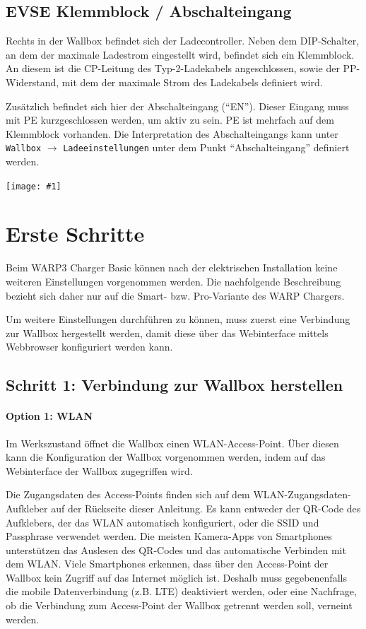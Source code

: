 \documentclass[a4paper,10pt]{article}
\newcommand{\gfx}[1]{\texttt{[image: \#1]}}
\begin{document}
\begin{multicols*}{2}
    \vspace{-0.1cm}
	\subsection{EVSE Klemmblock / Abschalteingang}\label{abschalteingang}
	Rechts in der Wallbox befindet sich der Ladecontroller. Neben dem DIP-Schalter,
	an dem der maximale Ladestrom eingestellt wird, befindet sich ein
	Klemmblock. An diesem ist die CP-Leitung des Typ-2-Ladekabels angeschlossen,
	sowie der PP-Widerstand, mit dem der maximale Strom des Ladekabels
	definiert wird.

	Zusätzlich befindet sich hier der Abschalteingang (\enquote{EN}).
	Dieser Eingang muss mit PE kurzgeschlossen werden, um aktiv zu sein. PE ist
	mehrfach auf dem Klemmblock vorhanden. Die Interpretation des Abschalteingangs kann unter \texttt{Wallbox} $\rightarrow$ \texttt{Ladeeinstellungen} unter dem Punkt \enquote{Abschalteingang} definiert werden.

    \gfx{./img_warp3/resized/evse_clamp.jpg}

    \newpage
    \section{Erste Schritte}\label{setup}

    Beim WARP3 Charger Basic können nach der elektrischen Installation
    keine weiteren Einstellungen vorgenommen werden. Die nachfolgende
    Beschreibung bezieht sich daher nur auf die Smart- bzw. Pro-Variante des WARP
    Chargers.

    Um weitere Einstellungen durchführen zu können, muss zuerst eine Verbindung
    zur Wallbox hergestellt werden, damit diese über das Webinterface mittels
	Webbrowser konfiguriert werden kann.

    \subsection{Schritt 1: Verbindung zur Wallbox herstellen}

    \paragraph{Option 1: WLAN}
    Im Werkszustand öffnet die Wallbox einen WLAN-Access-Point. Über diesen kann
    die Konfiguration der Wallbox vorgenommen werden, indem auf das
    Webinterface der Wallbox zugegriffen wird.

    Die Zugangsdaten des Access-Points finden sich auf dem WLAN-Zugangsdaten-Aufkleber
    auf der Rückseite dieser Anleitung. Es kann entweder der QR-Code des Aufklebers,
    der das WLAN automatisch konfiguriert, oder die SSID und Passphrase verwendet werden.
    Die meisten Kamera-Apps von Smartphones unterstützen das Auslesen des
    QR-Codes und das automatische Verbinden mit dem WLAN. Viele Smartphones
    erkennen, dass über den Access-Point der Wallbox kein Zugriff auf das
    Internet möglich ist. Deshalb muss gegebenenfalls die mobile Datenverbindung (z.B. LTE) deaktiviert werden, oder eine Nachfrage, ob die Verbindung zum Access-Point der Wallbox getrennt werden soll, verneint werden.


\end{multicols*}
\end{document}
